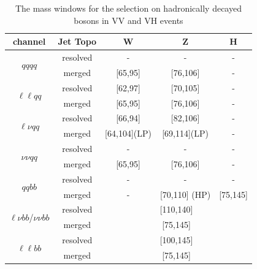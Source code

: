 \begin{table}
	\caption{The mass windows for the selection on hadronically decayed bosons in VV and VH events}
	\label{Tab:VVVH_masswindow}
	\begin{tabular}{c|c|c|c|c}
		\hline
		channel                                    & Jet Topo  & W       &    Z     &  H \\
		\hline
		\hline
		\multirow{ 2}{*}{$qqqq$}                   & resolved  & - & - &  - \\
		\cline{2-5}
                                                   & merged    & [65,95] & [76,106] &  - \\
		\hline
		\multirow{ 2}{*}{$\ell\ell qq$}            & resolved  & [62,97] & [70,105] &  - \\
		\cline{2-5}
                                                   & merged    & [65,95] & [76,106] &  - \\
		\hline 
		\multirow{ 2}{*}{$\ell\nu qq$}             & resolved  & [66,94] & [82,106] &  - \\
		\cline{2-5}
                                                   & merged    & [64,104](LP) & [69,114](LP) &  - \\
		\hline
		\multirow{ 2}{*}{$\nu\nu qq$}              & resolved  & - & - &  - \\
		\cline{2-5}
                                                   & merged    & [65,95] & [76,106] &  - \\
		\hline 
		\multirow{ 2}{*}{$qqbb$}                   & resolved  & - & - &  - \\
		\cline{2-5}
                                                   & merged    & - & [70,110] (HP) &  [75,145] \\
		\hline 
		\multirow{ 2}{*}{$\ell\nu bb$/$\nu\nu bb$} & resolved  & \multicolumn{3}{c}{[110,140]} \\
		\cline{2-5}
                                                   & merged    & \multicolumn{3}{c}{[75,145]} \\
	    \hline
		\multirow{ 2}{*}{$\ell\ell bb$}            & resolved  & \multicolumn{3}{c}{[100,145]} \\
        \cline{2-5}
                                                   & merged    & \multicolumn{3}{c}{[75,145]} \\
        \hline
	\end{tabular}
\end{table} 
